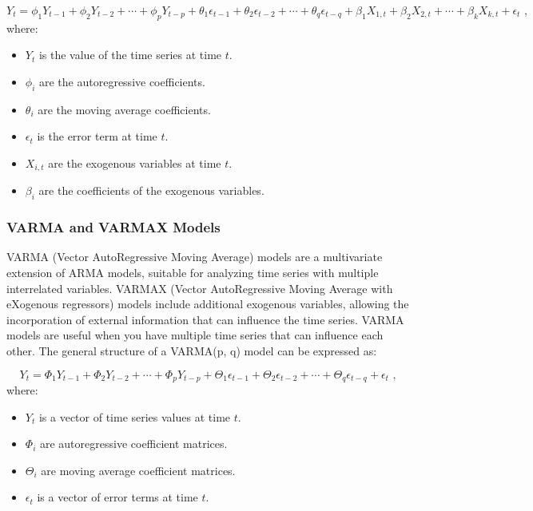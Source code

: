 \begin{equation}
Y_t = \phi_1 Y_{t-1} + \phi_2 Y_{t-2} + \cdots + \phi_p Y_{t-p} + \theta_1 \epsilon_{t-1} + \theta_2 \epsilon_{t-2} + \cdots + \theta_q \epsilon_{t-q} + \beta_1 X_{1,t} + \beta_2 X_{2,t} + \cdots + \beta_k X_{k,t} + \epsilon_t \text{ ,}
\end{equation}where:
\begin{itemize}
    \item \( Y_t \) is the value of the time series at time \( t \).
    \item \( \phi_i \) are the autoregressive coefficients.
    \item \( \theta_i \) are the moving average coefficients.
    \item \( \epsilon_t \) is the error term at time \( t \).
    \item \( X_{i,t} \) are the exogenous variables at time \( t \).
    \item \( \beta_i \) are the coefficients of the exogenous variables.
\end{itemize}
\vspace{10pt}

\subsubsection{VARMA and VARMAX Models}

VARMA (Vector AutoRegressive Moving Average) models are a multivariate extension of ARMA models, suitable for analyzing time series with multiple interrelated variables. VARMAX (Vector AutoRegressive Moving Average with eXogenous regressors) models include additional exogenous variables, allowing the incorporation of external information that can influence the time series. VARMA models are useful when you have multiple time series that can influence each other. The general structure of a VARMA(p, q) model can be expressed as:

\begin{equation}
Y_t = \Phi_1 Y_{t-1} + \Phi_2 Y_{t-2} + \cdots + \Phi_p Y_{t-p} + \Theta_1 \epsilon_{t-1} + \Theta_2 \epsilon_{t-2} + \cdots + \Theta_q \epsilon_{t-q} + \epsilon_t \text{ ,}
\end{equation}where:
\begin{itemize}
    \item \( Y_t \) is a vector of time series values at time \( t \).
    \item \( \Phi_i \) are autoregressive coefficient matrices.
    \item \( \Theta_i \) are moving average coefficient matrices.
    \item \( \epsilon_t \) is a vector of error terms at time \( t \).
\end{itemize}
\vspace{10pt}

